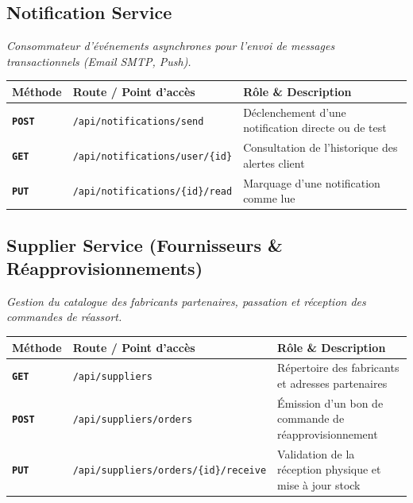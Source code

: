 \documentclass[10pt,a4paper]{article}
\begin{document}
\vspace{3pt}

\subsection{Notification Service}
\textit{Consommateur d'événements asynchrones pour l'envoi de messages transactionnels (Email SMTP, Push).}

\begin{center}
\renewcommand{\arraystretch}{1.08}
\begin{tabularx}{\textwidth}{@{} l p{6.8cm} >{\raggedright\arraybackslash}X @{}}
\toprule[0.8pt]
\rowcolor{hdrcolor}
\textbf{Méthode} & \textbf{Route / Point d'accès} & \textbf{Rôle \& Description} \\
\midrule
\textcolor{postgreen}{\texttt{\textbf{POST}}} & \texttt{/api/notifications/send} & Déclenchement d'une notification directe ou de test \\
\textcolor{syncblue}{\texttt{\textbf{GET}}}  & \texttt{/api/notifications/user/\{id\}} & Consultation de l'historique des alertes client \\
\textcolor{secondary}{\texttt{\textbf{PUT}}}  & \texttt{/api/notifications/\{id\}/read} & Marquage d'une notification comme lue \\
\bottomrule[0.8pt]
\end{tabularx}
\end{center}

\vspace{3pt}

\subsection{Supplier Service (Fournisseurs \& Réapprovisionnements)}
\textit{Gestion du catalogue des fabricants partenaires, passation et réception des commandes de réassort.}

\begin{center}
\renewcommand{\arraystretch}{1.08}
\begin{tabularx}{\textwidth}{@{} l p{6.8cm} >{\raggedright\arraybackslash}X @{}}
\toprule[0.8pt]
\rowcolor{hdrcolor}
\textbf{Méthode} & \textbf{Route / Point d'accès} & \textbf{Rôle \& Description} \\
\midrule
\textcolor{syncblue}{\texttt{\textbf{GET}}}  & \texttt{/api/suppliers} & Répertoire des fabricants et adresses partenaires \\
\textcolor{postgreen}{\texttt{\textbf{POST}}} & \texttt{/api/suppliers/orders} & Émission d'un bon de commande de réapprovisionnement \\
\textcolor{secondary}{\texttt{\textbf{PUT}}}  & \texttt{/api/suppliers/orders/\{id\}/receive} & Validation de la réception physique et mise à jour stock \\
\bottomrule[0.8pt]
\end{tabularx}
\end{center}
\end{document}
